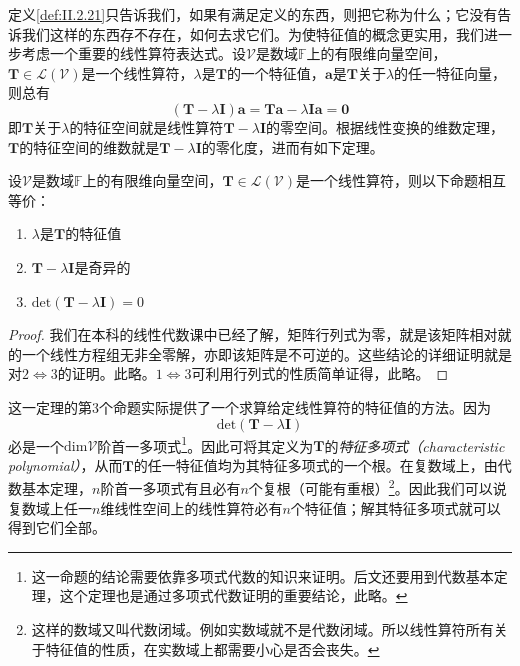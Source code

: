 \documentclass[main.tex]{subfiles}
\begin{document}
定义\ref{def:II.2.21}只告诉我们，如果有满足定义的东西，则把它称为什么；它没有告诉我们这样的东西存不存在，如何去求它们。为使特征值的概念更实用，我们进一步考虑一个重要的线性算符表达式。设$\mathcal{V}$是数域$\mathbb{F}$上的有限维向量空间，$\mathbf{T}\in\mathcal{L}\left(\mathcal{V}\right)$是一个线性算符，$\lambda$是$\mathbf{T}$的一个特征值，$\mathbf{a}$是$\mathbf{T}$关于$\lambda$的任一特征向量，则总有
\[\left(\mathbf{T}-\lambda\mathbf{I}\right)\mathbf{a}=\mathbf{Ta}-\lambda\mathbf{Ia}=\mathbf{0}\]
即$\mathbf{T}$关于$\lambda$的特征空间就是线性算符$\mathbf{T}-\lambda\mathbf{I}$的零空间。根据线性变换的维数定理，$\mathbf{T}$的特征空间的维数就是$\mathbf{T}-\lambda\mathbf{I}$的零化度，进而有如下定理。

\begin{theorem}\label{thm:II.2.27}
    设$\mathcal{V}$是数域$\mathbb{F}$上的有限维向量空间，$\mathbf{T}\in\mathcal{L}\left(\mathcal{V}\right)$是一个线性算符，则以下命题相互等价：
    \begin{enumerate}
        \item $\lambda$是$\mathbf{T}$的特征值
        \item $\mathbf{T}-\lambda\mathbf{I}$是奇异的
        \item $\mathrm{det}\left(\mathbf{T}-\lambda\mathbf{I}\right)=0$
    \end{enumerate}
    \begin{proof}
        我们在本科的线性代数课中已经了解，矩阵行列式为零，就是该矩阵相对就的一个线性方程组无非全零解，亦即该矩阵是不可逆的。这些结论的详细证明就是对$2\Leftrightarrow 3$的证明。此略。$1\Leftrightarrow 3$可利用行列式的性质简单证得，此略。
    \end{proof}
\end{theorem}

这一定理的第3个命题实际提供了一个求算给定线性算符的特征值的方法。因为
\[\mathrm{det}\left(\mathbf{T}-\lambda\mathbf{I}\right)\]
必是一个$\mathrm{dim}\mathcal{V}$阶首一多项式\footnote{这一命题的结论需要依靠多项式代数的知识来证明。后文还要用到代数基本定理，这个定理也是通过多项式代数证明的重要结论，此略\cite{Hoffman1971}。}。因此可将其定义为$\mathbf{T}$的\emph{特征多项式}\emph{（characteristic polynomial）}，从而$\mathbf{T}$的任一特征值均为其特征多项式的一个根。在复数域上，由代数基本定理，$n$阶首一多项式有且必有$n$个复根（可能有重根）\footnote{这样的数域又叫代数闭域。例如实数域就不是代数闭域。所以线性算符所有关于特征值的性质，在实数域上都需要小心是否会丧失。}。因此我们可以说复数域上任一$n$维线性空间上的线性算符必有$n$个特征值；解其特征多项式就可以得到它们全部。
\end{document}
